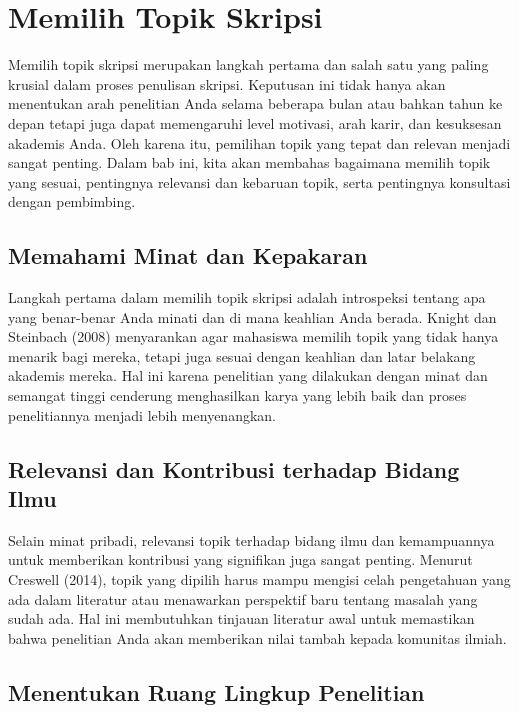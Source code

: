 \documentclass[
  indonesian,
  letterpaper,
]{scrbook}
\begin{document}

\chapter{Memilih Topik Skripsi}\label{memilih-topik-skripsi}

Memilih topik skripsi merupakan langkah pertama dan salah satu yang
paling krusial dalam proses penulisan skripsi. Keputusan ini tidak hanya
akan menentukan arah penelitian Anda selama beberapa bulan atau bahkan
tahun ke depan tetapi juga dapat memengaruhi level motivasi, arah karir,
dan kesuksesan akademis Anda. Oleh karena itu, pemilihan topik yang
tepat dan relevan menjadi sangat penting. Dalam bab ini, kita akan
membahas bagaimana memilih topik yang sesuai, pentingnya relevansi dan
kebaruan topik, serta pentingnya konsultasi dengan pembimbing.

\section{Memahami Minat dan
Kepakaran}\label{memahami-minat-dan-kepakaran}

Langkah pertama dalam memilih topik skripsi adalah introspeksi tentang
apa yang benar-benar Anda minati dan di mana keahlian Anda berada.
Knight dan Steinbach (2008) menyarankan agar mahasiswa memilih topik
yang tidak hanya menarik bagi mereka, tetapi juga sesuai dengan keahlian
dan latar belakang akademis mereka. Hal ini karena penelitian yang
dilakukan dengan minat dan semangat tinggi cenderung menghasilkan karya
yang lebih baik dan proses penelitiannya menjadi lebih menyenangkan.

\section{Relevansi dan Kontribusi terhadap Bidang
Ilmu}\label{relevansi-dan-kontribusi-terhadap-bidang-ilmu}

Selain minat pribadi, relevansi topik terhadap bidang ilmu dan
kemampuannya untuk memberikan kontribusi yang signifikan juga sangat
penting. Menurut Creswell (2014), topik yang dipilih harus mampu mengisi
celah pengetahuan yang ada dalam literatur atau menawarkan perspektif
baru tentang masalah yang sudah ada. Hal ini membutuhkan tinjauan
literatur awal untuk memastikan bahwa penelitian Anda akan memberikan
nilai tambah kepada komunitas ilmiah.

\section{Menentukan Ruang Lingkup
Penelitian}\label{menentukan-ruang-lingkup-penelitian}
\end{document}
